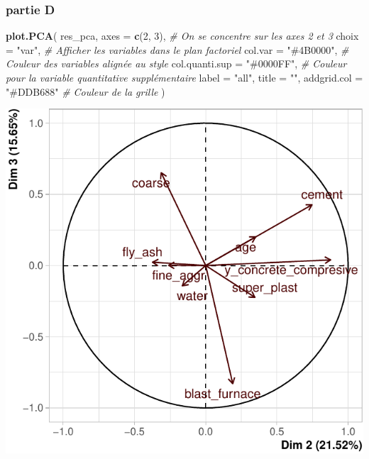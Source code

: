 \documentclass[
  12pt,
]{article}
\newenvironment{Shaded}{\begin{snugshade}}{\end{snugshade}}
\newcommand{\AttributeTok}[1]{\textcolor[rgb]{0.13,0.29,0.53}{#1}}
\newcommand{\CommentTok}[1]{\textcolor[rgb]{0.56,0.35,0.01}{\textit{#1}}}
\newcommand{\DecValTok}[1]{\textcolor[rgb]{0.00,0.00,0.81}{#1}}
\newcommand{\FunctionTok}[1]{\textcolor[rgb]{0.13,0.29,0.53}{\textbf{#1}}}
\newcommand{\NormalTok}[1]{#1}
\newcommand{\StringTok}[1]{\textcolor[rgb]{0.31,0.60,0.02}{#1}}
\begin{document}
\subsubsection{partie D}\label{partie-d}

\begin{Shaded}
\begin{Highlighting}[]
\FunctionTok{plot.PCA}\NormalTok{(}
\NormalTok{    res\_pca,}
    \AttributeTok{axes =} \FunctionTok{c}\NormalTok{(}\DecValTok{2}\NormalTok{, }\DecValTok{3}\NormalTok{),             }\CommentTok{\# On se concentre sur les axes 2 et 3}
    \AttributeTok{choix =} \StringTok{"var"}\NormalTok{,              }\CommentTok{\# Afficher les variables dans le plan factoriel}
    \AttributeTok{col.var =} \StringTok{"\#4B0000"}\NormalTok{,        }\CommentTok{\# Couleur des variables alignée au style}
    \AttributeTok{col.quanti.sup =} \StringTok{"\#0000FF"}\NormalTok{, }\CommentTok{\# Couleur pour la variable quantitative supplémentaire}
    \AttributeTok{label =} \StringTok{"all"}\NormalTok{,}
    \AttributeTok{title =} \StringTok{""}\NormalTok{,}
    \AttributeTok{addgrid.col =} \StringTok{"\#DDB688"}     \CommentTok{\# Couleur de la grille}
\NormalTok{  )}
\end{Highlighting}
\end{Shaded}

\begin{center}\includegraphics{rmd_final_files/figure-latex/unnamed-chunk-54-1} \end{center}
\end{document}
